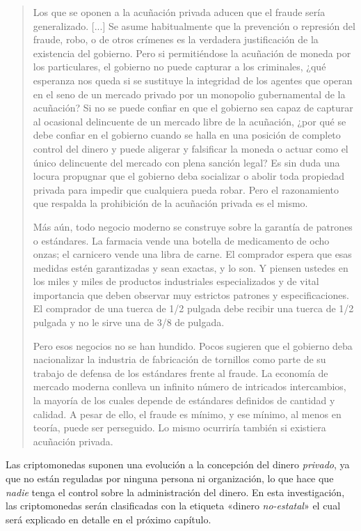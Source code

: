 \documentclass[12pt,a4paper,twoside]{book}
\begin{document}
\begin{quotation}
Los que se oponen a la acuñación privada aducen que el fraude sería generalizado. [...] Se asume habitualmente que la prevención o represión del fraude, robo, o de otros crímenes es la verdadera justificación de la existencia del gobierno. Pero si permitiéndose la acuñación de moneda por los particulares, el gobierno no puede capturar a los criminales, ¿qué esperanza nos queda si se sustituye la integridad de los agentes que operan en el seno de un mercado privado por un monopolio gubernamental de la acuñación? Si no se puede confiar en que el gobierno sea capaz de capturar al ocasional delincuente de un mercado libre de la acuñación, ¿por qué se debe confiar en el gobierno cuando se halla en una posición de completo control del dinero y puede aligerar y falsificar la moneda o actuar como el único delincuente del mercado con plena sanción legal? Es sin duda una locura propugnar que el gobierno deba socializar o abolir toda propiedad privada para impedir que cualquiera pueda robar. Pero el razonamiento que respalda la prohibición de la acuñación privada es el mismo.

Más aún, todo negocio moderno se construye sobre la garantía de patrones o estándares. La farmacia vende una botella de medicamento de ocho onzas; el carnicero vende una libra de carne. El comprador espera que esas medidas estén garantizadas y sean exactas, y lo son. Y piensen ustedes en los miles y miles de productos industriales especializados y de vital importancia que deben observar muy estrictos patrones y especificaciones. El comprador de una tuerca de 1/2 pulgada debe recibir una tuerca de 1/2 pulgada y no le sirve una de 3/8 de pulgada.

Pero esos negocios no se han hundido. Pocos sugieren que el gobierno deba nacionalizar la industria de fabricación de tornillos como parte de su trabajo de defensa de los estándares frente al fraude. La economía de mercado moderna conlleva un infinito número de intricados intercambios, la mayoría de los cuales depende de estándares definidos de cantidad y calidad. A pesar de ello, el fraude es mínimo, y ese mínimo, al menos en teoría, puede ser perseguido. Lo mismo ocurriría también si existiera acuñación privada. \cite[págs. 17-18]{rothbard:dinero}
\end{quotation}

Las criptomonedas suponen una evolución a la concepción del dinero \textit{privado}, ya que no están reguladas por ninguna persona ni organización, lo que hace que \textit{nadie} tenga el control sobre la administración del dinero. En esta investigación, las criptomonedas serán clasificadas con la etiqueta «dinero \textit{no-estatal}» el cual será explicado en detalle en el próximo capítulo.
\end{document}
